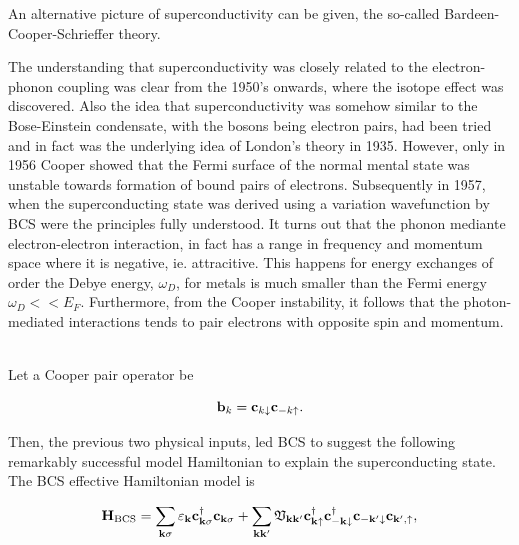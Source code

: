 \documentclass{homework}
\begin{document}
An alternative picture of superconductivity can be given, the so-called Bardeen-Cooper-Schrieffer theory.

\begin{tcolorbox}[colback = LimeGreen, title = Historical Context:]

The understanding that superconductivity was closely related to the electron-phonon coupling was clear from the 1950's onwards, where the isotope effect was discovered. Also the idea that superconductivity was somehow similar to the Bose-Einstein condensate, with the bosons being electron pairs, had been tried and in fact was the underlying idea of London's theory in 1935. However, only in 1956 Cooper showed that the Fermi surface of the normal mental state was unstable towards formation of bound pairs of electrons. Subsequently in 1957, when the superconducting state was derived using a variation wavefunction by BCS were the principles fully understood. It turns out that the phonon mediante electron-electron interaction, in fact has a range in frequency and momentum space where it is negative, ie. attracitive. This happens for energy exchanges of order the Debye energy, $\omega_D$, for metals is much smaller than the Fermi energy $\omega_D << E_F$. Furthermore, from the Cooper instability, it follows that the photon-mediated interactions tends to pair electrons with opposite spin and momentum.

\end{tcolorbox}

\blanky \\

Let a Cooper pair operator be

\begin{equation}
    {\bf b}_k = {\bf c}_{k \downarrow} {\bf c}_{-k \uparrow}.
\end{equation}

Then, the previous two physical inputs, led BCS to suggest the following remarkably successful model Hamiltonian to explain the superconducting state. The BCS effective Hamiltonian model is 

\begin{equation}
    {\bf H}_{\textnormal{BCS}} = \sum_{{\bf k} \sigma} \varepsilon_{{\bf k}} {\bf c}_{{\bf k} \sigma}^\dagger {\bf c}_{{\bf k} \sigma} + \sum_{{\bf k} {\bf k}'} {\mathfrak{V}}_{{\bf k}{\bf k}'} {\bf c}_{{\bf k} \uparrow}^\dagger {\bf c}_{-{\bf k} \downarrow}^\dagger {\bf c}_{-{\bf k}' \downarrow} {\bf c}_{{\bf k}', \uparrow}, 
\end{equation}
\end{document}
